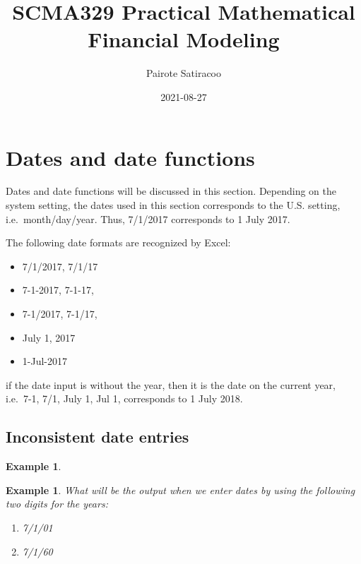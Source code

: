 \documentclass[
]{article}
\title{SCMA329 Practical Mathematical Financial Modeling}
\author{Pairote Satiracoo}
\date{2021-08-27}
\theoremstyle{definition}
\theoremstyle{definition}
\newtheorem{example}{Example}[section]
\theoremstyle{definition}
\theoremstyle{definition}
\theoremstyle{remark}
\begin{document}
\maketitle

{
\setcounter{tocdepth}{2}
\tableofcontents
}
\hypertarget{dates-and-date-functions}{%
\section{Dates and date functions}\label{dates-and-date-functions}}

Dates and date functions will be discussed in this section. Depending on
the system setting, the dates used in this section corresponds to the
U.S. setting, i.e.~month/day/year. Thus, 7/1/2017 corresponds to 1 July
2017.

The following date formats are recognized by Excel:

\begin{itemize}
\item
  7/1/2017, 7/1/17
\item
  7-1-2017, 7-1-17,
\item
  7-1/2017, 7-1/17,
\item
  July 1, 2017
\item
  1-Jul-2017
\end{itemize}

if the date input is without the year, then it is the date on the
current year, i.e.~7-1, 7/1, July 1, Jul 1, corresponds to 1 July 2018.

\hypertarget{inconsistent-date-entries}{%
\subsection{Inconsistent date entries}\label{inconsistent-date-entries}}

\begin{example}
\protect\hypertarget{exm:unlabeled-div-1}{}\label{exm:unlabeled-div-1}

\textbf{Example 1}. \emph{What will be the output when we enter dates by using the
following two digits for the years:}

\begin{enumerate}
\def\labelenumi{\arabic{enumi}.}
\item
  \emph{7/1/01}
\item
  \emph{7/1/60}
\end{enumerate}

\end{example}
\end{document}
